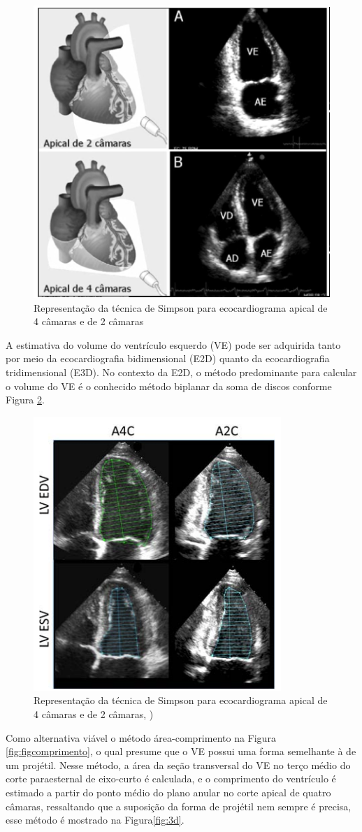 \begin{figure}[H]
\centering
\includegraphics[width=0.6\linewidth]{capitulos/figuras/Apical.png}
\caption{Representação da técnica de Simpson para ecocardiograma apical de 4 câmaras e de 2 câmaras \textcite{Lang2015} }
\label{fig:apical}
\end{figure}

A estimativa do volume do ventrículo esquerdo (VE) pode ser adquirida tanto por meio da ecocardiografia bidimensional (E2D) quanto da ecocardiografia tridimensional (E3D). No contexto da E2D, o método predominante para calcular o volume do VE é o conhecido método biplanar da soma de discos conforme Figura \ref{fig:figsimpsom}.

\begin{figure}[H]
\centering
\includegraphics[width=0.3\linewidth]{capitulos/figuras/simpsons.png}
\caption{Representação da técnica de Simpson para ecocardiograma apical de 4 câmaras e de 2 câmaras, \textcite{Lang2015})}
\label{fig:figsimpsom}
\end{figure}


Como alternativa viável  o método área-comprimento na Figura \ref{fig:figcomprimento}, o qual presume que o VE possui uma forma semelhante à de um projétil. Nesse método, a área da seção transversal do VE no terço médio do corte paraesternal de eixo-curto é calculada, e o comprimento do ventrículo é estimado a partir do ponto médio do plano anular no corte apical de quatro câmaras, ressaltando que a suposição da forma de projétil nem sempre é precisa, esse método é mostrado na Figura\ref{fig:3d}.



